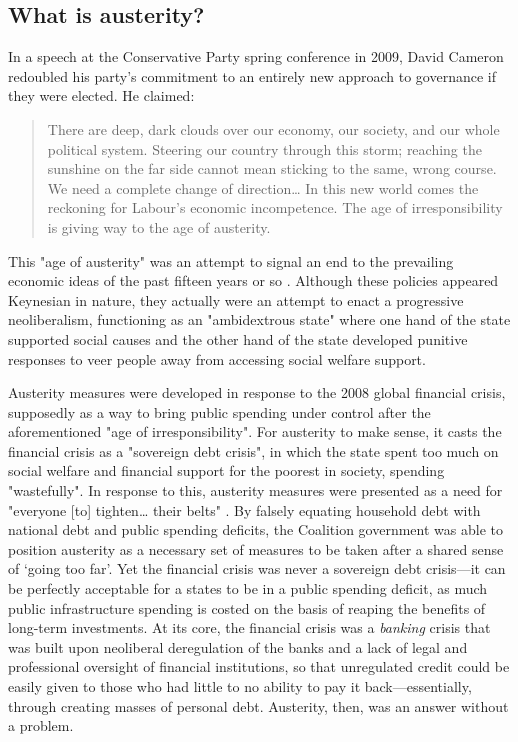 \subsection{What is austerity?}
\label{subsec:what-is-austerity}

In a speech at the Conservative Party spring conference in 2009, David Cameron redoubled his party's commitment to an entirely new approach to governance if they were elected. He claimed:

\begin{quote}
There are deep, dark clouds over our economy, our society, and our whole political system. Steering our country through this storm; reaching the sunshine on the far side cannot mean sticking to the same, wrong course. We need a complete change of direction\ldots{} In this new world comes the reckoning for Labour's economic incompetence. The age of irresponsibility is giving way to the age of austerity. \citep{cameron_age_2009}
\end{quote}

This "age of austerity" was an attempt to signal an end to the prevailing economic ideas of the past fifteen years or so \citep{blyth_austerity_2013}. Although these policies appeared Keynesian in nature, they actually were an attempt to enact a progressive neoliberalism, functioning as an "ambidextrous state" \citep[p. 104]{peck_zombie_2010} where one hand of the state supported social causes and the other  hand of the state developed punitive responses to veer people away from accessing social welfare support.

Austerity measures were developed in response to the 2008 global financial crisis, supposedly as a way to bring public spending under control after the aforementioned "age of irresponsibility". For austerity to make sense, it casts the financial crisis as a "sovereign debt crisis", in which the state spent too much on social welfare and financial support for the poorest in society, spending "wastefully". In response to this, austerity measures were presented as a need for "everyone [to] tighten\ldots{} their belts" \citep[p. 13]{blyth_austerity_2013}. By falsely equating household debt with national debt and public spending deficits, the Coalition government was able to position austerity as a necessary set of measures to be taken after a shared sense of `going too far'. Yet the financial crisis was never a sovereign debt crisis—it can be perfectly acceptable for a states to be in a public spending deficit, as much public infrastructure spending is costed on the basis of reaping the benefits of long-term investments. At its core, the financial crisis was a \textit{banking} crisis that was built upon neoliberal deregulation of the banks and a lack of legal and professional oversight of financial institutions, so that unregulated credit could be easily given to those who had little to no ability to pay it back—essentially, through creating masses of personal debt. Austerity, then, was an answer without a problem.

